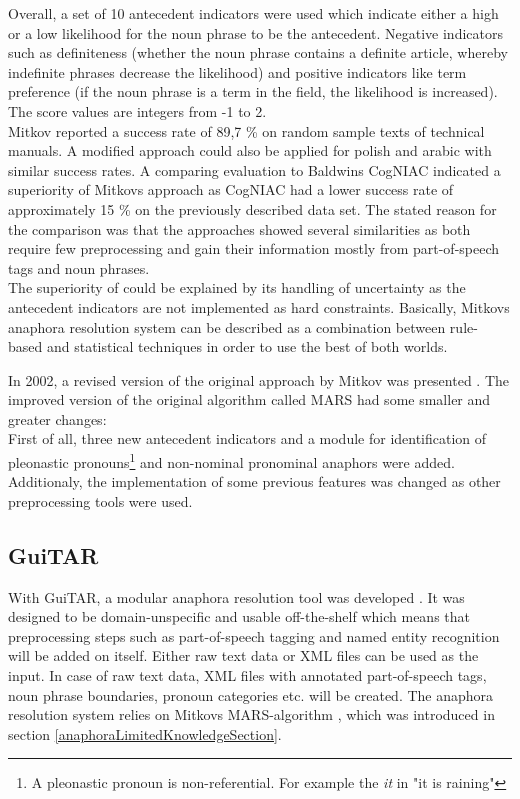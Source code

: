 Overall, a set of 10 antecedent indicators were used which indicate either a high or a low likelihood for the noun phrase to be the antecedent. Negative indicators such as definiteness (whether the noun phrase contains a definite article, whereby indefinite phrases decrease the likelihood) and positive indicators like term preference (if the noun phrase is a term in the field, the likelihood is increased). The score values are integers from -1 to 2. \\
Mitkov reported a success rate of 89,7 \% on random sample texts of technical manuals. A modified approach could also be applied for polish \citep{mitkov2000robust} and arabic \citep{mitkov1998multilingual} with similar success rates.
A comparing evaluation to Baldwins CogNIAC \citep{baldwin1997cogniac} indicated a superiority of Mitkovs approach \citep{mitkov1998robust} as CogNIAC had a lower success rate of approximately 15 \% on the previously described data set. The stated reason for the comparison was that the approaches showed several similarities as both require few preprocessing and gain their information mostly from part-of-speech tags and noun phrases.\\
The superiority of \citep{mitkov1998robust} could be explained by its handling of uncertainty as the antecedent indicators are not implemented as hard constraints. Basically, Mitkovs anaphora resolution system can be described as a combination between rule-based and statistical techniques in order to use the best of both worlds.

In 2002, a revised version of the original approach by Mitkov was presented \citep{mitkov2002new}. The improved version of the original algorithm called MARS had some smaller and greater changes:\\
First of all, three new antecedent indicators and a module for identification of pleonastic pronouns\footnote{A pleonastic pronoun is non-referential. For example the \textit{it} in "it is raining" } and non-nominal pronominal anaphors were added. Additionaly, the implementation of some previous features was changed as other preprocessing tools were used.

\subsection{GuiTAR}
With GuiTAR, a modular anaphora resolution tool was developed \citep{poesio2004general}. It was designed to be domain-unspecific and usable off-the-shelf which means that preprocessing steps such as part-of-speech tagging and named entity recognition will be added on itself. Either raw text data or XML files can be used as the input. In case of raw text data, XML files with annotated part-of-speech tags, noun phrase boundaries, pronoun categories etc. will be created. The anaphora resolution system relies on Mitkovs MARS-algorithm \citep{mitkov2002new}, which was introduced in section \ref{anaphoraLimitedKnowledgeSection}. 

